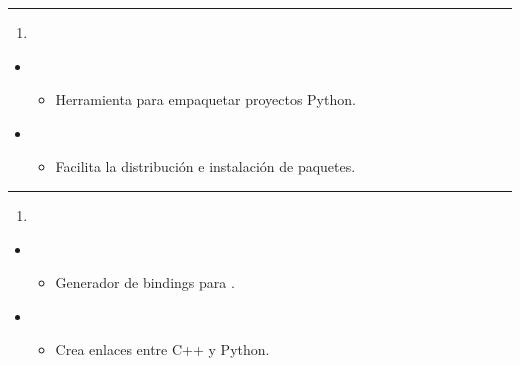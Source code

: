 \documentclass[a4paper,10pt,spanish]{sphinxmanual}
\begin{document}
\bigskip\hrule\bigskip

\begin{enumerate}
%
\setcounter{enumi}{26}
\item {} 
\sphinxAtStartPar
{}

\end{enumerate}
\begin{itemize}
\item {} 
\sphinxAtStartPar
{}
\begin{itemize}
\item {} 
\sphinxAtStartPar
Herramienta para empaquetar proyectos Python.

\end{itemize}

\item {} 
\sphinxAtStartPar
{}
\begin{itemize}
\item {} 
\sphinxAtStartPar
Facilita la distribución e instalación de paquetes.

\end{itemize}

\end{itemize}


\bigskip\hrule\bigskip

\begin{enumerate}
%
\setcounter{enumi}{27}
\item {} 
\sphinxAtStartPar
{}

\end{enumerate}
\begin{itemize}
\item {} 
\sphinxAtStartPar
{}
\begin{itemize}
\item {} 
\sphinxAtStartPar
Generador de bindings para .

\end{itemize}

\item {} 
\sphinxAtStartPar
{}
\begin{itemize}
\item {} 
\sphinxAtStartPar
Crea enlaces entre C++ y Python.

\end{itemize}

\end{itemize}
\end{document}
